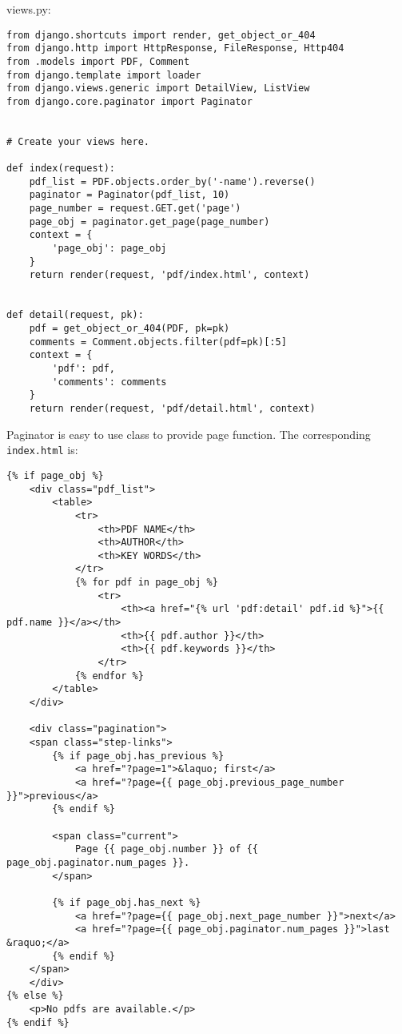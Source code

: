 views.py:
\begin{lstlisting}
from django.shortcuts import render, get_object_or_404
from django.http import HttpResponse, FileResponse, Http404
from .models import PDF, Comment
from django.template import loader
from django.views.generic import DetailView, ListView
from django.core.paginator import Paginator


# Create your views here.

def index(request):
    pdf_list = PDF.objects.order_by('-name').reverse()
    paginator = Paginator(pdf_list, 10)
    page_number = request.GET.get('page')
    page_obj = paginator.get_page(page_number)
    context = {
        'page_obj': page_obj
    }
    return render(request, 'pdf/index.html', context)


def detail(request, pk):
    pdf = get_object_or_404(PDF, pk=pk)
    comments = Comment.objects.filter(pdf=pk)[:5]
    context = {
        'pdf': pdf,
        'comments': comments
    }
    return render(request, 'pdf/detail.html', context)

\end{lstlisting}


Paginator is easy to use class to provide page function.
The corresponding \verb|index.html| is:
\lstset{language=Html}
\begin{lstlisting}
{% if page_obj %}
    <div class="pdf_list">
        <table>
            <tr>
                <th>PDF NAME</th>
                <th>AUTHOR</th>
                <th>KEY WORDS</th>
            </tr>
            {% for pdf in page_obj %}
                <tr>
                    <th><a href="{% url 'pdf:detail' pdf.id %}">{{ pdf.name }}</a></th>
                    <th>{{ pdf.author }}</th>
                    <th>{{ pdf.keywords }}</th>
                </tr>
            {% endfor %}
        </table>
    </div>

    <div class="pagination">
    <span class="step-links">
        {% if page_obj.has_previous %}
            <a href="?page=1">&laquo; first</a>
            <a href="?page={{ page_obj.previous_page_number }}">previous</a>
        {% endif %}

        <span class="current">
            Page {{ page_obj.number }} of {{ page_obj.paginator.num_pages }}.
        </span>

        {% if page_obj.has_next %}
            <a href="?page={{ page_obj.next_page_number }}">next</a>
            <a href="?page={{ page_obj.paginator.num_pages }}">last &raquo;</a>
        {% endif %}
    </span>
    </div>
{% else %}
    <p>No pdfs are available.</p>
{% endif %}
\end{lstlisting}


